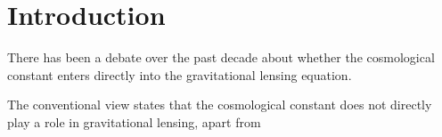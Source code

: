 \chapter{Introduction}

There has been a debate over the past decade about whether the cosmological constant enters directly into the gravitational lensing equation. 

The conventional view \cite{islam1983cosmological} states that the cosmological constant does not directly play a role in gravitational lensing, \cite{simpson2010lensing} apart from 